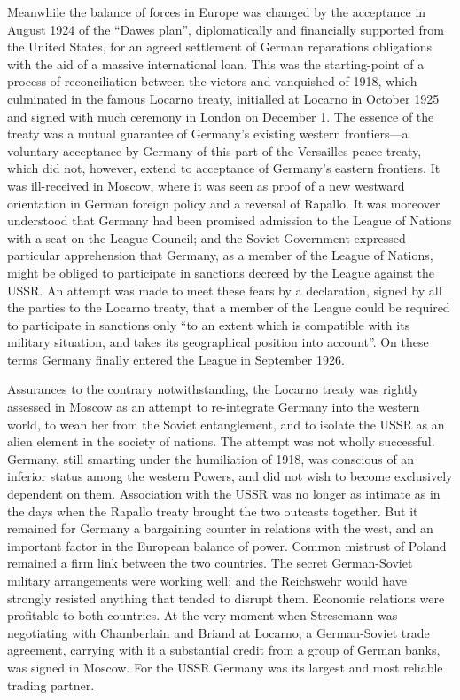 Meanwhile the balance of forces in Europe was changed by the acceptance in August 1924 of the ``Dawes plan'', diplomatically and financially supported from the United States, for an agreed settlement of German reparations obligations with the aid of a massive international loan. This was the starting-point of a process of reconciliation between the victors and vanquished of 1918, which culminated in the famous Locarno treaty, initialled at Locarno in October 1925 and signed with much ceremony in London on December 1. The essence of the treaty was a mutual guarantee of Germany's existing western frontiers---a voluntary acceptance by Germany of this part of the Versailles peace treaty, which did not, however, extend to acceptance of Germany's eastern frontiers. It was ill-received in Moscow, where it was seen as proof of a new westward orientation in German foreign policy and a reversal of Rapallo. It was moreover understood that Germany had been promised admission to the League of Nations with a seat on the League Council; and the Soviet Government expressed particular apprehension that Germany, as a member of the League of Nations, might be obliged to participate in sanctions decreed by the League against the USSR. An attempt was made to meet these fears by a declaration, signed by all the parties to the Locarno treaty, that a member of the League could be required to participate in sanctions only ``to an extent which is compatible with its military situation, and takes its geographical position into account''. On these terms Germany finally entered the League in September 1926. 

Assurances to the contrary notwithstanding, the Locarno treaty was rightly assessed in Moscow as an attempt to re-integrate Germany into the western world, to wean her from the Soviet entanglement, and to isolate the USSR as an alien element in the society of nations. The attempt was not wholly successful. Germany, still smarting under the humiliation of 1918, was conscious of an inferior status among the western Powers, and did not wish to become exclusively dependent on them. Association with the USSR was no longer as intimate as in the days when the Rapallo treaty brought the two outcasts together. But it remained for Germany a bargaining counter in relations with the west, and an important factor in the European balance of power. Common mistrust of Poland remained a firm link between the two countries. The secret German-Soviet military arrangements were working well; and the Reichswehr would have strongly resisted anything that tended to disrupt them. Economic relations were profitable to both countries. At the very moment when Stresemann was negotiating with Chamberlain and Briand at Locarno, a German-Soviet trade agreement, carrying with it a substantial credit from a group of German banks, was signed in Moscow. For the USSR Germany was its largest and most reliable trading partner. 

